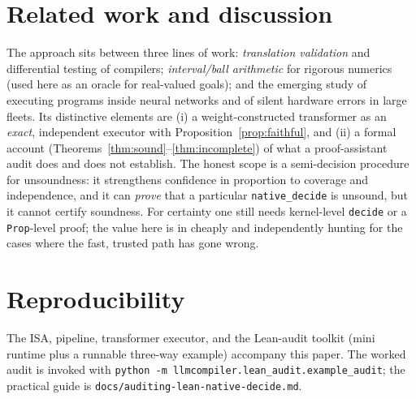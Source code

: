 \documentclass[11pt]{article}
\theoremstyle{definition}
\theoremstyle{plain}
\theoremstyle{remark}
\begin{document}
\section{Related work and discussion}

The approach sits between three lines of work: \emph{translation validation} and differential testing of
compilers; \emph{interval/ball arithmetic} for rigorous numerics (used here as an oracle for
real-valued goals); and the emerging study of executing programs inside neural networks and of silent
hardware errors in large fleets. Its distinctive elements are (i) a weight-constructed transformer as an
\emph{exact}, independent executor with Proposition~\ref{prop:faithful}, and (ii) a formal account
(Theorems~\ref{thm:sound}--\ref{thm:incomplete}) of what a proof-assistant audit does and does not
establish. The honest scope is a semi-decision procedure for unsoundness: it strengthens confidence in
proportion to coverage and independence, and it can \emph{prove} that a particular \texttt{native\_decide}
is unsound, but it cannot certify soundness. For certainty one still needs kernel-level \texttt{decide} or
a \texttt{Prop}-level proof; the value here is in cheaply and independently hunting for the cases where
the fast, trusted path has gone wrong.

\section*{Reproducibility}
The ISA, pipeline, transformer executor, and the Lean-audit toolkit (mini runtime plus a runnable
three-way example) accompany this paper. The worked audit is invoked with
\texttt{python -m llmcompiler.lean\_audit.example\_audit}; the practical guide is
\texttt{docs/auditing-lean-native-decide.md}.
\end{document}
